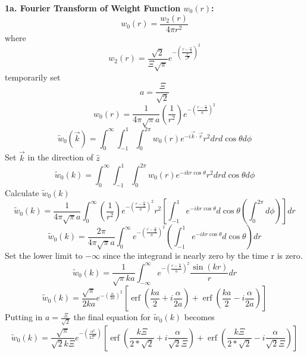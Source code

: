 \documentclass[12pt]{article}
\begin{document}
\textbf{1a. Fourier Transform of Weight Function $w_0(r)$:}
\begin{equation}{w_0(r)=\frac{w_2(r)}{4{\pi}r^2}}\end{equation}
where
\begin{equation}{w_2(r)=\frac{\sqrt{2}}{\Xi\sqrt{\pi}}e^{-\left(\frac{r-\frac{\alpha}{2}}{\frac{\Xi}{\sqrt{2}}}\right)^2}}\end{equation}
temporarily set 
\begin{equation}{a=\frac{\Xi}{\sqrt{2}}}\end{equation}
\begin{equation}{w_0(r)=\frac{1}{4{\pi}\sqrt{\pi}a}\left(\frac{1}{r^2}\right)e^{-\left(\frac{r-\frac{\alpha}{2}}{a}\right)^2}}\end{equation}
\begin{equation}{\widetilde{w}_0(\vec{k})=\int_{0}^{\infty}\int_{-1}^{1}\int_{0}^{2\pi}w_0(r)e^{-i\vec{k}\cdot{\vec{r}}}r^2d{r}d{\cos\theta}d{\phi}}\end{equation}
Set $\vec{k}$ in the direction of $\hat{z}$ 
\begin{equation}{\widetilde{w}_0(k)=\int_{0}^{\infty}\int_{-1}^{1}\int_{0}^{2\pi}w_0(r)e^{-ikr\cos\theta}r^2d{r}d{\cos\theta}d{\phi}}\end{equation}
\[{}\]
Calculate $\widetilde{w}_0(k)$ 
\begin{equation}{\widetilde{w}_0(k)=\frac{1}{4{\pi}\sqrt{\pi}a}\int_{0}^{\infty}\left(\frac{1}{r^2}\right)e^{-\left(\frac{r-\frac{\alpha}{2}}{a}\right)^2}r^2\left[\int_{-1}^{1}e^{-ikr\cos\theta}d{\cos\theta}\left(\int_{0}^{2\pi}d{\phi}\right)\right]d{r}}\end{equation}
\[{}\]
\begin{equation}{\widetilde{w}_0(k)=\frac{2\pi}{4{\pi}\sqrt{\pi}a}\int_{0}^{\infty}e^{-\left(\frac{r-\frac{\alpha}{2}}{a}\right)^2}\left(\int_{-1}^{1}e^{-ikr\cos\theta}d{\cos\theta}\right)d{r}}\end{equation}
\[{}\]
Set the lower limit to $-\infty$  since the integrand is nearly zero by the time r is zero. 
\begin{equation}{\widetilde{w}_0(k)=\frac{1}{\sqrt{\pi}ka}\int_{-\infty}^{\infty}e^{-\left(\frac{r-\frac{\alpha}{2}}{a}\right)^2}\frac{\sin(kr)}{r}d{r}}\end{equation}
\[{}\]
\begin{equation}{\widetilde{w}_0(k)=\frac{\sqrt{\pi}}{2ka}e^{-\left(\frac{\alpha}{2a}\right)^2}\left[\operatorname{erf}\left(\frac{ka}{2}+i\frac{\alpha}{2a}\right)+\operatorname{erf}\left(\frac{ka}{2}-i\frac{\alpha}{2a}\right)\right]}\end{equation}
\[{}\] 
Putting in $a=\frac{\Xi}{\sqrt{2}}$ the final equation for $\widetilde{w}_0(k)$ becomes
\begin{equation}{\widetilde{w}_0(k)=\frac{\sqrt{\pi}}{\sqrt{2}k\Xi}e^{-\left(\frac{\alpha^2}{2\Xi^2}\right)}\left[\operatorname{erf}\left(\frac{k\Xi}{2*\sqrt{2}}+i\frac{\alpha}{\sqrt{2}\Xi}\right)+\operatorname{erf}\left(\frac{k\Xi}{2*\sqrt{2}}-i\frac{\alpha}{\sqrt{2}\Xi}\right)\right]}\end{equation}
\end{document}
